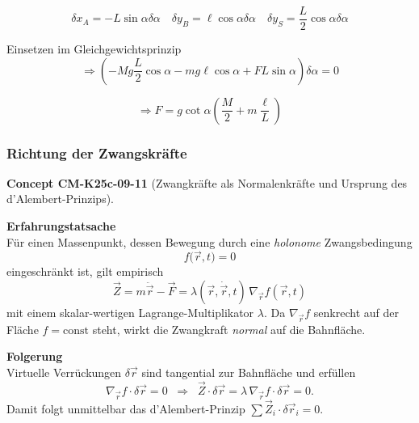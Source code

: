 \documentclass[10pt, letterpaper]{article}
\newcommand{\CustomHeading}[3]{%
  \par\medskip\noindent%
  \textbf{#1 #2} \textnormal{(#3)}.\enskip%
}
\newenvironment{CONC}[2]{\begin{unitbox}\CustomHeading{Concept}{#1}{#2}}{\end{unitbox}}
\begin{document}
$$\delta x_A = -L\sin\alpha \delta\alpha \quad
\delta y_B = \ell \cos\alpha \delta\alpha \quad
\delta y_S = \frac{L}{2} \cos\alpha \delta\alpha$$

Einsetzen im Gleichgewichtsprinzip
\[\Rightarrow(-Mg\frac{L}{2}\cos\alpha - mg\ell\cos\alpha + FL\sin\alpha)\delta\alpha = 0\]

\[\Rightarrow F = g\cot\alpha\left(\frac{M}{2} + m\frac{\ell}{L}\right)\]








\pagebreak




\subsubsection{Richtung der Zwangskräfte}



\begin{CONC}{CM-K25c-09-11}{Zwangkräfte als Normalenkräfte und Ursprung des d’Alembert-Prinzips}
\textbf{Erfahrungstatsache}\\
Für einen Massenpunkt, dessen Bewegung durch eine \emph{holonome}
Zwangsbedingung
\[
  f\!\bigl(\vec r,t\bigr)=0
\]
eingeschränkt ist, gilt empirisch
\[
  \boxed{\;
    \vec Z = m\ddot{\vec r}-\vec F
    = \lambda(\vec r,\dot{\vec r},t)\,
      \nabla_{\!\vec r} f(\vec r,t)
  \;}
\]
mit einem skalar-wertigen Lagrange-Multiplikator $\lambda$.  
Da $\nabla_{\!\vec r}f$ senkrecht auf der Fläche $f=\text{const}$
steht, wirkt die Zwangkraft \emph{normal} auf die Bahnfläche.

\textbf{Folgerung}\\
Virtuelle Verrückungen $\delta\vec r$ sind tangential zur
Bahnfläche und erfüllen
\[
  \nabla_{\!\vec r} f\!\cdot\!\delta\vec r = 0
  \;\;\Longrightarrow\;\;
  \vec Z\!\cdot\!\delta\vec r
  = \lambda\,\nabla_{\!\vec r}f\!\cdot\!\delta\vec r = 0 .
\]
Damit folgt unmittelbar das d’Alembert-Prinzip
$\sum\vec Z_i\!\cdot\!\delta\vec r_i = 0$.
\end{CONC}

\end{document}
